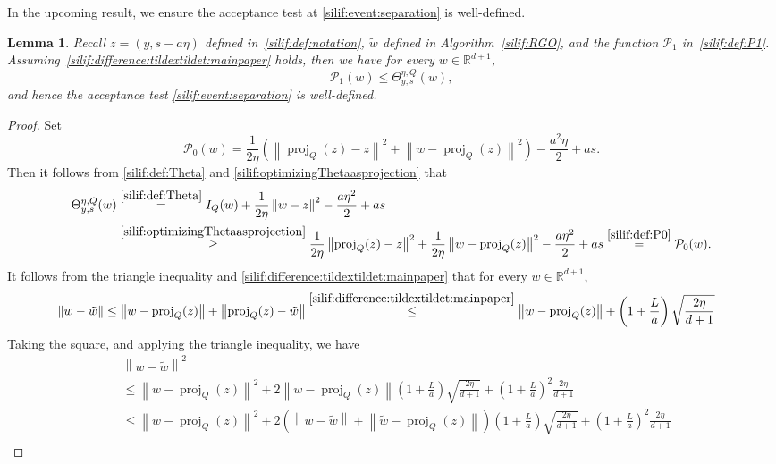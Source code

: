 \documentclass[11pt,letterpaper]{article}
\newcommand{\R}{\mathbb{R}}
\newcommand{\norm}[1]{\left\lVert #1 \right\rVert}
\newcommand{\proj}{\operatorname{proj}}
\newcommand{\nn}{\nonumber}
\newcommand{\brac}[1]{\left( #1\right)}
\newtheorem{lemma}[thm]{Lemma}
\begin{document}
In the upcoming result, we ensure the acceptance test at \eqref{silif:event:separation} is well-defined.
\begin{lemma}\label{silif:lem:compareThetaP1}  
Recall $z=(y,s-a\eta)$ defined in~\eqref{silif:def:notation}, $\tilde{w}$ defined in Algorithm~\ref{silif:RGO}, and the function $\mathcal{P}_1$ in~\eqref{silif:def:P1}. Assuming~\eqref{silif:difference:tildextildet:mainpaper} holds, then we have for every $w\in \R^{d+1}$,
\[
    \mathcal{P}_1(w)\leq \Theta_{y,s}^{\eta,Q}(w),
\]
and hence the acceptance test \eqref{silif:event:separation} is well-defined.

\end{lemma}
\begin{proof}
Set 
\begin{equation}
\label{silif:def:P0}
    \mathcal{P}_0(w)=\frac{1}{2\eta}\brac{\norm{\proj_Q(z)-z}^2+\norm{w - \proj_Q(z)}^2}  - \frac{a^2\eta}{2} + a s. 
\end{equation}
Then it follows from \eqref{silif:def:Theta} and \eqref{silif:optimizingThetaasprojection} that
    \begin{align}
    \label{silif:ineq:compareThetaP1}
    \Theta^{\eta,Q}_{y,s}(w) &\stackrel{\eqref{silif:def:Theta}}=I_Q(w) +\frac{1}{2\eta}\norm{w-z}^2- \frac{a\eta^2}{2} + a s\nn\\
        & \stackrel{\eqref{silif:optimizingThetaasprojection}}\geq \frac{1}{2\eta}\norm{\proj_Q(z)-z}^2 +\frac{1}{2\eta}\norm{w - \proj_Q(z)}^2- \frac{a\eta^2}{2} + a s\stackrel{\eqref{silif:def:P0}}=\mathcal{P}_0(w).
    \end{align}
It follows from the triangle inequality and \eqref{silif:difference:tildextildet:mainpaper} that for every $w\in \R^{d+1}$, 
\begin{align}
\label{silif:estimatewihoutsquare}
    &\norm{w-\tilde{w}}\leq \norm{w-\proj_Q(z)}+\norm{\proj_Q(z)-\tilde{w}} \stackrel{\eqref{silif:difference:tildextildet:mainpaper}}\leq \norm{w-\proj_Q(z)}+\brac{1+\frac{L}{a}}\sqrt{\frac{2\eta}{d+1}}
\end{align}
    Taking the square, and applying the triangle inequality, we have
    \begin{align*}
        &\norm{w-\tilde{w}}^2\\
        &\leq \norm{w-\proj_Q(z)}^2+2\norm{w-\proj_Q(z)}\brac{1+\frac{L}{a}}\sqrt{\frac{2\eta}{d+1}}+\brac{1+\frac{L}{a}}^2\frac{2\eta}{d+1}\\
        &\leq \norm{w-\proj_Q(z)}^2+2\brac{\norm{w-\tilde{w}} +\norm{\tilde{w}- \proj_Q(z)}}\brac{1+\frac{L}{a}}\sqrt{\frac{2\eta}{d+1}}+\brac{1+\frac{L}{a}}^2\frac{2\eta}{d+1}\\

\end{align*}
\end{proof}
\end{document}
